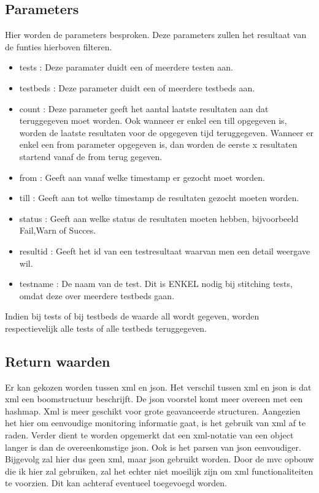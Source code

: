 \documentclass[11pt]{article}
\begin{document}
\subsection{Parameters}
Hier worden de parameters besproken. Deze parameters zullen het resultaat van de funties hierboven filteren.

\begin{itemize}
\item tests : Deze paramater duidt een of meerdere testen aan.
\item testbeds : Deze parameter duidt een of meerdere testbeds aan.
\item count : Deze parameter geeft het aantal laatste resultaten aan dat teruggegeven moet worden. 
Ook wanneer er enkel een till opgegeven is, worden de laatste resultaten voor de opgegeven tijd teruggegeven.
Wanneer er enkel een from parameter opgegeven is, dan worden de eerste x resultaten startend vanaf de from terug gegeven.
\item from : Geeft aan vanaf welke timestamp er gezocht moet worden.
\item till : Geeft aan tot welke timestamp de resultaten gezocht moeten worden.
\item status : Geeft aan welke status de resultaten moeten hebben, bijvoorbeeld Fail,Warn of Succes.
\item resultid : Geeft het id van een testresultaat waarvan men een detail weergave wil.
\item testname : De naam van de test. Dit is ENKEL nodig bij stitching tests, omdat deze over meerdere testbeds gaan. 
\end{itemize}
Indien bij tests of bij testbeds de waarde all wordt gegeven, worden respectievelijk alle tests of alle testbeds teruggegeven.

\subsection{Return waarden}
Er kan gekozen worden tussen xml en json. Het verschil tussen xml en json is dat xml een boomstructuur beschrijft. De json voorstel komt meer overeen met een hashmap. Xml is meer geschikt voor grote geavanceerde structuren. Aangezien het hier om eenvoudige monitoring informatie gaat, is het gebruik van xml af te raden. Verder dient te worden opgemerkt dat een xml-notatie van een object langer is dan de overeenkomstige json. Ook is het parsen van json eenvoudiger. Bijgevolg zal hier dus geen xml, maar json gebruikt worden. Door de mvc opbouw die ik hier zal gebruiken, zal het echter niet moeilijk zijn om xml functionaliteiten te voorzien. Dit kan achteraf eventueel toegevoegd worden.\\
\end{document}
